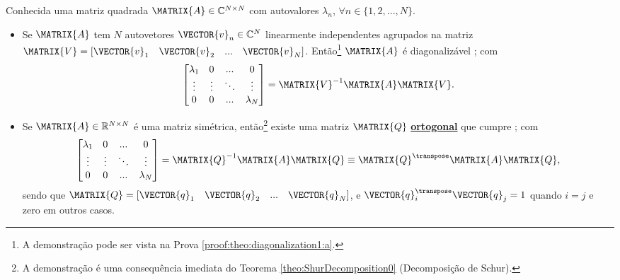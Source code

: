 \begin{theorem}\label{theo:diagonalization1}
Conhecida uma matriz quadrada $\MATRIX{A} \in \mathbb{C}^{N \times N}$ com
autovalores $\lambda_n$, $\forall n \in \{1, 2, ..., N\}$.
\begin{itemize}
\item Se $\MATRIX{A}$ tem $N$  autovetores $\VECTOR{v}_n \in \mathbb{C}^{N}$  linearmente independentes
agrupados na matriz $\MATRIX{V}=\left[\VECTOR{v}_1\quad \VECTOR{v}_2\quad  ...\quad \VECTOR{v}_N\right]$.
Então\footnote{A demonstração pode ser vista na Prova \ref{proof:theo:diagonalization1:a}.} 
$\MATRIX{A}$ é diagonalizável \cite[pp. 67]{golub2013matrix} \cite[pp. 61]{axelsson1996iterative};
com
\begin{equation}
\begin{bmatrix}
\lambda_1 & 0         & ...    & 0 \\
\vdots    & \vdots    & \ddots & \vdots \\
0         & 0         & ...    & \lambda_N
\end{bmatrix}
=\MATRIX{V}^{-1}\MATRIX{A}\MATRIX{V}.
\end{equation}
\item Se $\MATRIX{A}\in \mathbb{R}^{N \times N}$ é uma matriz simétrica, então\footnote{A
demonstração é uma consequência imediata do Teorema \ref{theo:ShurDecomposition0} (Decomposição de Schur).}
existe uma matriz $\MATRIX{Q}$ \hyperref[def:ortogonalmatrix0]{\textbf{ortogonal}} que cumpre \cite[pp. 67, 440]{golub2013matrix};
com
\begin{equation}
\begin{bmatrix}
\lambda_1 & 0         & ...    & 0 \\
\vdots    & \vdots    & \ddots & \vdots \\
0         & 0         & ...    & \lambda_N
\end{bmatrix}
=\MATRIX{Q}^{-1}\MATRIX{A}\MATRIX{Q}
\equiv \MATRIX{Q}^{\transpose}\MATRIX{A}\MATRIX{Q},
\end{equation}
sendo que $\MATRIX{Q}=\left[\VECTOR{q}_1\quad \VECTOR{q}_2\quad ...\quad \VECTOR{q}_N\right]$,
e $\VECTOR{q}_i^{\transpose}\VECTOR{q}_j=1$ quando $i=j$ e zero em outros casos.
\end{itemize}
\end{theorem}

